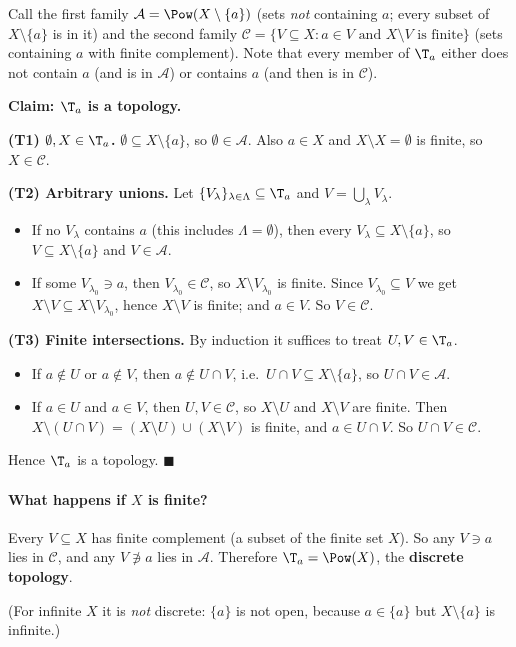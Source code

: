 
Call the first family $\mathcal{A}=\Pow(X\setminus\{a\})$ (sets \emph{not} containing $a$;
every subset of $X\setminus\{a\}$ is in it) and the second family
$\mathcal{C}=\{V\subseteq X : a\in V \text{ and } X\setminus V \text{ is finite}\}$ (sets
containing $a$ with finite complement). Note that every member of $\T_a$ either does not
contain $a$ (and is in $\mathcal{A}$) or contains $a$ (and then is in $\mathcal{C}$).

\textbf{Claim: $\T_a$ is a topology.}

\textbf{(T1) $\emptyset,X\in\T_a$.} $\emptyset\subseteq X\setminus\{a\}$, so
$\emptyset\in\mathcal{A}$. Also $a\in X$ and $X\setminus X=\emptyset$ is finite, so
$X\in\mathcal{C}$.

\textbf{(T2) Arbitrary unions.} Let $\{V_\lambda\}_{\lambda\in\Lambda}\subseteq\T_a$ and
$V=\bigcup_\lambda V_\lambda$.
\begin{itemize}[nosep]
  \item If no $V_\lambda$ contains $a$ (this includes $\Lambda=\emptyset$), then every
        $V_\lambda\subseteq X\setminus\{a\}$, so $V\subseteq X\setminus\{a\}$ and
        $V\in\mathcal{A}$.
  \item If some $V_{\lambda_0}\ni a$, then $V_{\lambda_0}\in\mathcal{C}$, so
        $X\setminus V_{\lambda_0}$ is finite. Since $V_{\lambda_0}\subseteq V$ we get
        $X\setminus V\subseteq X\setminus V_{\lambda_0}$, hence $X\setminus V$ is finite; and
        $a\in V$. So $V\in\mathcal{C}$.
\end{itemize}

\textbf{(T3) Finite intersections.} By induction it suffices to treat $U,V\in\T_a$.
\begin{itemize}[nosep]
  \item If $a\notin U$ or $a\notin V$, then $a\notin U\cap V$, i.e.\
        $U\cap V\subseteq X\setminus\{a\}$, so $U\cap V\in\mathcal{A}$.
  \item If $a\in U$ and $a\in V$, then $U,V\in\mathcal{C}$, so $X\setminus U$ and
        $X\setminus V$ are finite. Then $X\setminus(U\cap V)=(X\setminus U)\cup(X\setminus V)$
        is finite, and $a\in U\cap V$. So $U\cap V\in\mathcal{C}$.
\end{itemize}
Hence $\T_a$ is a topology. $\blacksquare$

\paragraph{What happens if $X$ is finite?} Every $V\subseteq X$ has finite complement (a subset
of the finite set $X$). So any $V\ni a$ lies in $\mathcal{C}$, and any $V\not\ni a$ lies in
$\mathcal{A}$. Therefore $\T_a=\Pow(X)$, the \textbf{discrete topology}.

(For infinite $X$ it is \emph{not} discrete: $\{a\}$ is not open, because $a\in\{a\}$ but
$X\setminus\{a\}$ is infinite.)
